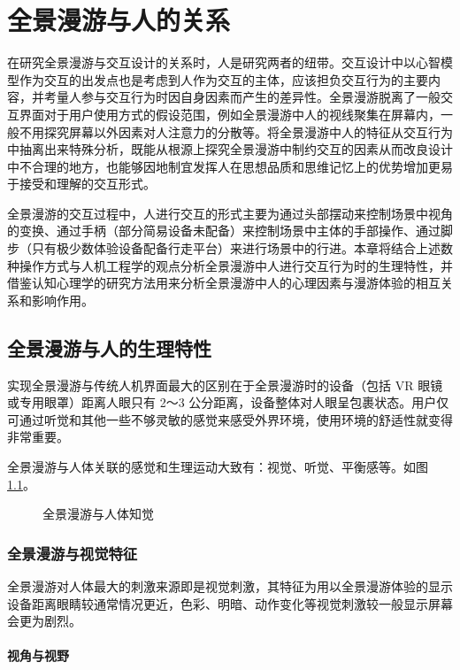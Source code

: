 \chapter{全景漫游与人的关系}

在研究全景漫游与交互设计的关系时，人是研究两者的纽带。交互设计中以心智模型作为交互的出发点也是考虑到人作为交互的主体，应该担负交互行为的主要内容，并考量人参与交互行为时因自身因素而产生的差异性。全景漫游脱离了一般交互界面对于用户使用方式的假设范围，例如全景漫游中人的视线聚集在屏幕内，一般不用探究屏幕以外因素对人注意力的分散等。将全景漫游中人的特征从交互行为中抽离出来特殊分析，既能从根源上探究全景漫游中制约交互的因素从而改良设计中不合理的地方，也能够因地制宜发挥人在思想品质和思维记忆上的优势增加更易于接受和理解的交互形式。

全景漫游的交互过程中，人进行交互的形式主要为通过头部摆动来控制场景中视角的变换、通过手柄（部分简易设备未配备）来控制场景中主体的手部操作、通过脚步（只有极少数体验设备配备行走平台）来进行场景中的行进。本章将结合上述数种操作方式与人机工程学的观点分析全景漫游中人进行交互行为时的生理特性，并借鉴认知心理学的研究方法用来分析全景漫游中人的心理因素与漫游体验的相互关系和影响作用。

\section{全景漫游与人的生理特性}
实现全景漫游与传统人机界面最大的区别在于全景漫游时的设备（包括 VR 眼镜或专用眼罩）距离人眼只有 2～3 公分距离，设备整体对人眼呈包裹状态。用户仅可通过听觉和其他一些不够灵敏的感觉来感受外界环境，使用环境的舒适性就变得非常重要。

全景漫游与人体关联的感觉和生理运动大致有：视觉、听觉、平衡感等。如图\ref{fig:human_sence}。

\begin{figure}[htp]
\centering
{}
\caption{全景漫游与人体知觉}
\label{fig:human_sence}
\end{figure}

\subsection{全景漫游与视觉特征}
全景漫游对人体最大的刺激来源即是视觉刺激，其特征为用以全景漫游体验的显示设备距离眼睛较通常情况更近，色彩、明暗、动作变化等视觉刺激较一般显示屏幕会更为剧烈。

\subsubsection{视角与视野}

